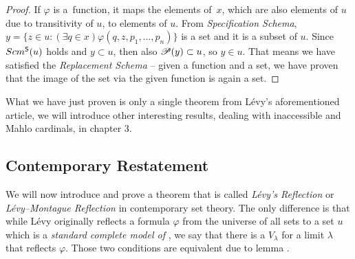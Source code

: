 \begin{proof}
If $\varphi$ is a~function, %
it maps the elements of~$x$, which are also elements of $u$ due to transitivity of $u$, to elements of $u$. 
From \emph{Specification Schema}, $y = \{ z \in u : (\exists q \in x)\varphi(q, z, p_1, \ldots, p_n)\}$ is a set and it is a subset of $u$. 
Since $Scm^{\sf{S}}(u)$ holds and $y \subset u$, then also $\mathscr{P} (y) \subset u$, so $y \in u$.
That means we have satisfied the \emph{Replacement Schema} – given a function and a set, we have proven that the image of the set via the given function is again a set.
\end{proof} %

What we have just proven is only a single theorem from Lévy's aforementioned article, we will introduce other interesting results, dealing with inaccessible and Mahlo cardinals, in chapter 3.


\subsection{Contemporary Restatement}
We will now introduce and prove a theorem that is called \emph{Lévy's Reflection} or \emph{Lévy–Montague Reflection} in contemporary set theory. The only difference is that while Lévy originally reflects a formula $\varphi$ from the universe of all sets to a set $u$ which is a \emph{standard complete model of }, we say that there is a $V_\lambda$ for a limit $\lambda$ that reflects $\varphi$. Those two conditions are equivalent due to lemma .


